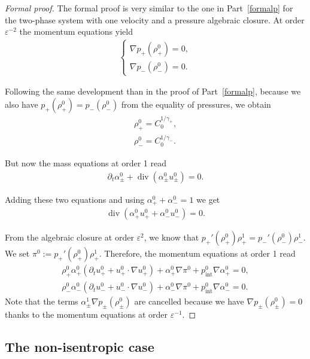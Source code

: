 \documentclass[11pt, twoside, a4paper]{article}
\theoremstyle{plain}
\theoremstyle{remark}
\numberwithin{equation}{section}
\renewcommand{\div}{\operatorname{div}}
\newcommand{\dt}{\partial_t}
\newcommand{\eps}{\varepsilon}
\newcommand{\ap}{\alpha_+}
\newcommand{\am}{\alpha_-}
\newcommand{\rp}{\rho_+}
\newcommand{\rmi}{\rho_-}
\begin{document}
\begin{proof}[Formal proof]
The formal proof is very similar to the one in Part~\ref{formalp} for the two-phase system with one velocity and a pressure algebraic closure. At order $\eps^{-2}$ the momentum equations yield
\begin{align*}
    \left\{
        \begin{array}{l}
              \nabla p_+(\rho_+^0) = 0, \\
              \nabla p_-(\rho_-^0) = 0.
        \end{array}
    \right.
\end{align*}

Following the same development than in the proof of Part~\ref{formalp}, because we also have $p_+(\rp^0)=p_-(\rmi^0)$ from the equality of pressures, we obtain
\begin{align*}
    \rho_+^0 = C_0^{1/\gamma_+},\\
    \rho_-^0 = C_0^{1/\gamma_-}.
\end{align*}

But now the mass equations at order 1 read
\begin{align*}
    \dt \alpha_\pm^0 + \div (\alpha_\pm^0 u_\pm^0) = 0.
\end{align*}

Adding these two equations and using $\ap^0+\am^0=1$ we get
\begin{align*}
    \div (\ap^0 u_+^0 + \am^0 u_-^0) = 0.
\end{align*}

From the algebraic closure at order $\eps^2$, we know that $p_+'(\rp^0) \rp^1 = p_-'(\rmi^0) \rmi^1$. We set $\pi^0 := p_+'(\rp^0) \rp^1$. Therefore, the momentum equations at order 1 read
\begin{align*}
    \rp^0 \ap^0 ( \dt u_+^0 + u_+^0 \cdot\nabla u_+^0) + \ap^0 \nabla \pi^0 + p_{\mathrm{int}}^0 \nabla \ap^0 = 0,\\
    \rmi^0 \am^0 (\dt u_-^0 + u_-^0 \cdot\nabla u_-^0) + \am^0 \nabla \pi^0 + p_{\mathrm{int}}^0 \nabla \am^0 = 0.
\end{align*}
Note that the terms $\alpha_\pm^1 \nabla p_\pm(\rho_\pm^0)$ are cancelled because we have $\nabla p_\pm(\rho_\pm^0)=0$ thanks to the momentum equations at order $\eps^{-1}$.
\end{proof}


\subsection{The non-isentropic case}
\end{document}
